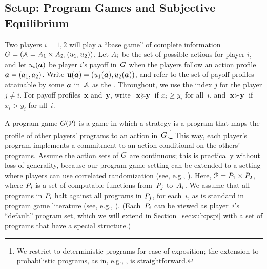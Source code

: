 \documentclass[sigconf]{aamas}
\theoremstyle{definition}
\begin{document}
\subsection{Setup: Program Games and Subjective Equilibrium}
\label{sub:proggame}

Two players $i=1,2$ will play a ``base game'' 
of complete information $G = (\mathcal{A} = A_1 \times A_2, (u_1, u_2))$.
Let $A_i$
be the set
of possible actions for player $i$,
and let $u_i(\boldsymbol{a})$
be player $i$'s
payoff in~$G$
when the players
follow an action profile 
$\boldsymbol{a} = (a_1, a_2)$.
Write 
$\textbf{u}(\boldsymbol{a}) = (u_1(\boldsymbol{a}), u_2(\boldsymbol{a}))$, and refer to the 
set of payoff profiles attainable 
by some $\boldsymbol{a}$ in~$\mathcal{A}$ 
as the . 
Throughout, we use the index
$j$ for the player $j \neq i$.
For payoff profiles~$\textbf{x}$ and~$\textbf{y}$,
write~$\textbf{x} \succeq \textbf{y}$ if $x_i \geq y_i$ for all~$i$, and
$\textbf{x} \succ \textbf{y}$ if $x_i > y_i$ for all~$i$.

A program game $G(\mathcal{P})$ is a 
game in which a strategy
is a program that maps
the 
profile
of other players' programs
to an action in~$G$.\footnote{We restrict to deterministic
programs for ease of exposition; the extension 
to probabilistic
programs,
as in, e.g., \citet{kalai2010commitment}, is straightforward.}
This way, each player's program implements
a commitment
to an action
conditional on the others' programs.
Assume the action sets of $G$ are continuous; this is practically without loss of generality, because our program game setting can be
extended to a setting where players can use correlated randomization (see, e.g., \citet{kalai2010commitment}).
Here, $\mathcal{P} = P_1 \times P_2$,
where $P_i$ is a 
set of
computable functions
from~$P_j$
to~$A_i$.
We assume that all programs in $P_i$
halt against all programs in $ P_j$,
for each~$i$, as is standard in program game literature (see, e.g., \citet{tennenholtz2004program, oesterheld2019robust, oesterheld2021safe}).
(Each~$P_i$ can be viewed
as player~$i$'s ``default'' program
set,
which we will extend in
Section~\ref{sec:sub:pspi}
with a set of programs that
have a special structure.)
\end{document}
